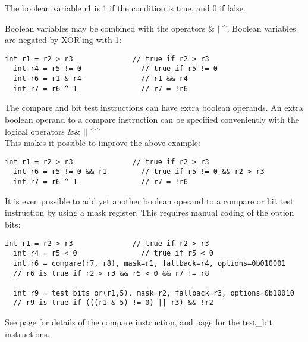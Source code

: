 \documentclass[forwardcom.tex]{subfiles}
\begin{document}
The boolean variable r1 is 1 if the condition is true, and 0 if false. 
\vv

Boolean variables may be combined with the operators 
\hspace{2mm} \& \hspace{2mm} $\vert$ \hspace{2mm} \^{}. Boolean variables are negated by XOR'ing with 1:
 
\begin{lstlisting}[frame=single]
  int r1 = r2 > r3              // true if r2 > r3
  int r4 = r5 != 0              // true if r5 != 0
  int r6 = r1 & r4              // r1 && r4
  int r7 = r6 ^ 1               // r7 = !r6
\end{lstlisting}
\vv

The compare and bit test instructions can have extra boolean operands. 
An extra boolean operand to a compare instruction can be specified conveniently with the logical operators 
\hspace{2mm} \&\& \hspace{2mm} $\vert\vert$ \hspace{2mm} \^{}\^{} \hspace{2mm}  \\
This makes it possible to improve the above example:

\begin{lstlisting}[frame=single]
  int r1 = r2 > r3              // true if r2 > r3
  int r6 = r5 != 0 && r1        // true if r5 != 0 && r2 > r3
  int r7 = r6 ^ 1               // r7 = !r6
\end{lstlisting}
\vv

It is even possible to add yet another boolean operand to a compare or bit test instruction by using a mask register. This requires manual coding of the option bits:

\begin{lstlisting}[frame=single]
  int r1 = r2 > r3              // true if r2 > r3
  int r4 = r5 < 0               // true if r5 < 0
  int r6 = compare(r7, r8), mask=r1, fallback=r4, options=0b010001
  // r6 is true if r2 > r3 && r5 < 0 && r7 != r8
  
  int r9 = test_bits_or(r1,5), mask=r2, fallback=r3, options=0b10010
  // r9 is true if (((r1 & 5) != 0) || r3) && !r2
\end{lstlisting}
\vv

See page \pageref{table:compareInstruction} for details of the compare instruction, and page \pageref{table:testBitInstruction} for the test\_bit instructions.
\vv
\end{document}
